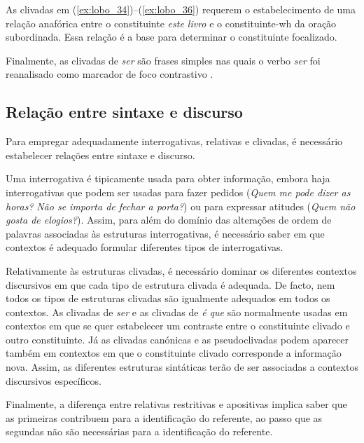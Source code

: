 \documentclass[output=paper]{LSP/langsci}
\begin{document}
As clivadas em (\ref{ex:lobo_34})--(\ref{ex:lobo_36}) requerem o estabelecimento de uma relação anafórica entre o constituinte \textit{este livro} e o constituinte-wh da oração subordinada. Essa relação é a base para determinar o constituinte focalizado.

Finalmente, as clivadas de \textit{ser} são frases simples nas quais o verbo \textit{ser} foi reanalisado como marcador de foco contrastivo \citep{santos_etal2013,vercauteren2015}.


\subsection{Relação entre sintaxe e discurso}
\label{subsec:lobo_relacao_sint_disc}

Para empregar adequadamente interrogativas, relativas e clivadas, é necessário estabelecer relações entre sintaxe e discurso.

Uma interrogativa é tipicamente usada para obter informação, embora haja interrogativas que podem ser usadas para fazer pedidos (\textit{Quem me pode dizer as horas?} \textit{Não se importa de fechar a porta?}) ou para expressar atitudes (\textit{Quem não gosta de elogios?}). Assim, para além do domínio das alterações de ordem de palavras associadas às estruturas interrogativas, é necessário saber em que contextos é adequado formular diferentes tipos de interrogativas.

Relativamente às estruturas clivadas, é necessário dominar os diferentes contextos discursivos em que cada tipo de estrutura clivada é adequada. De facto, nem todos os tipos de estruturas clivadas são igualmente adequados em todos os contextos. As clivadas de \textit{ser} e as clivadas de \textit{é que} são normalmente usadas em contextos em que se quer estabelecer um contraste entre o constituinte clivado e outro constituinte. Já as clivadas canónicas e as pseudoclivadas podem aparecer também em contextos em que o constituinte clivado corresponde a informação nova. Assim, as diferentes estruturas sintáticas terão de ser associadas a contextos discursivos específicos.

Finalmente, a diferença entre relativas restritivas e apositivas implica saber que as primeiras contribuem para a identificação do referente, ao passo que as segundas não são necessárias para a identificação do referente.
\end{document}
